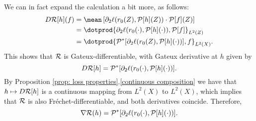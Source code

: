 We can in fact expand the calculation a bit more, as follows:
\begin{align*}
    D \risk [ h ] ( f )
    &= \mean \left[
        \partial_{ 2 } \ell ( r_{ 0 } ( Z ), \meanop [ h ] ( Z ) ) \cdot \meanop [ f ] ( Z )
    \right] \\
    &= \dotprod{ \partial_{ 2 } \ell ( r_{ 0 } ( \cdot ), \meanop [ h ] ( \cdot ) ), \meanop [ f ] }_{ L^{ 2 } ( Z ) } \\
    &= \dotprod{ \meanop^{ * } [ \partial_{ 2 } \ell ( r_{ 0 } ( Z ), \meanop [ h ] ( \cdot ) ) ], f }_{ L^{ 2 } ( X ) }
.\end{align*}
This shows that $ \mathcal{R} $ is Gateux-differentiable, with Gateux derivative at $ h $ given by
\begin{equation*}
    D \mathcal{R} [ h ] = \mathcal{P}^{ * } [ \partial_{ 2 } \ell ( r_{ 0 } ( \cdot ), \mathcal{P} [ h ] ( \cdot ) ) ]
.\end{equation*}
By Proposition \ref{prop: loss properties}.\ref{continuous composition} we have that $ h \mapsto D \mathcal{R} [ h ] $ is a continuous mapping from $ L^{ 2 } ( X ) $ to $ L^{ 2 } ( X ) $, which implies that $ \mathcal{R} $ is also Fréchet-differentiable, and both derivatives coincide.
Therefore,
\begin{equation*}
   \nabla \mathcal{R} ( h ) = \mathcal{P}^{ * } [ \partial_{ 2 } \ell ( r_{ 0 } ( \cdot ), \mathcal{P} [ h ] ( \cdot ) ) ]  
.\end{equation*}
